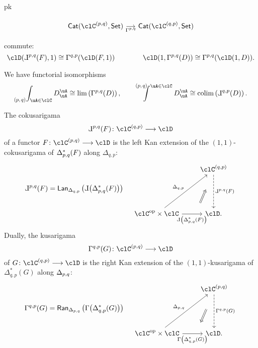 \documentclass[11pt]{amsart}
\begin{document}
\begin{proposition}
\begin{enumtag}{pk}
\begin{center}
\begin{adjustbox}{max height=0.5\textheight, max width=0.875\textwidth}
{\[\begin{tikzcd}[row sep={4.5em,between origins}, column sep={5.0em,between origins}, ampersand replacement=\&]
							\Cat(\pq{\clC},\textsf{Set}) \ar[rr,"\kgfpq{p}{q}"']\&\& \Cat(\pq{\clC}[q][p],\textsf{Set})
						\end{tikzcd}
					\]
				}
			\end{adjustbox}
		\end{center}
        commute:
		\[ 	\clD(\ckgpq{p}{q}{F},1) \cong \kgpq{q}{p}{\clD(F,1)} \qquad \qquad
			\clD(1,\kgpq{p}{q}{D}) \cong \kgpq{p}{q}{\clD(1,D)}.\]
		\item\label{co-limits-of-kusarigamas}We have functorial isomorphisms
		\[
			\pqEnd{p}{q}{\uA\in\clC}D^{\uA}_{\uA}   \cong \lim\left(\kgpq{p}{q}{D}\right),   \qquad
			\pqCoend{p}{q}{\uA\in\clC}D^{\uA}_{\uA} \cong \colim\left(\ckgpq{q}{p}{D}\right).
		\]
		\item\label{higher-arity-co-kusarigamas-from-1-1-co-kusarigamas}The cokusarigama
		\[\ckgpq{p}{q}{F}\colon\pq{\clC}[q][p]\longrightarrow\clD\]
		of a functor $F\colon\pq{\clC}\longrightarrow\clD$ is the left Kan extension of the $(1,1)$-cokusarigama of $\Delta_{p,q}^{*}(F)$ along $\Delta_{q,p}$:
		\[
			\ckgpq{p}{q}{F}
			=
			\Lan_{\Delta_{q,p}}\left(\ckgb{\Delta_{p,q}^{*}(F)}\right)
			\quad
			\begin{tikzcd}[row sep={6.3em,between origins}, column sep={8.1em,between origins}, ampersand replacement=\&]
				{}
				\&
				\pq{\clC}[q][p]
				\arrow[d, "\ckgpq{p}{q}{F}", dashed]
				\\
				\clC^{\op}\times\clC
				\arrow[ru, "\Delta_{q,p}"]
				\arrow[r, "\ckgb{\pqdiag^{*}(F)}"'{name=F}]
				\&
				\clD.
				\arrow[from=F,to=1-2,shorten=2.0em,Rightarrow,xshift=-0.0em,yshift=-0.25em]
			\end{tikzcd}
		\]
		Dually, the kusarigama
		\[\kgpq{q}{p}{G}\colon\pq{\clC}\longrightarrow\clD\]
		of $G\colon\pq{\clC}[q][p]\longrightarrow\clD$ is the right Kan extension of the $(1,1)$-kusarigama of $\Delta_{q,p}^{*}(G)$ along $\Delta_{p,q}$:
		\[
			\kgpq{q}{p}{G}
			=
			\Ran_{\Delta_{p,q}}\left(\kgb{\Delta_{q,p}^{*}(G)}\right)
			\quad
			\begin{tikzcd}[row sep={6.3em,between origins}, column sep={8.1em,between origins}, ampersand replacement=\&]
				{}
				\&
				\pq{\clC}
				\arrow[d, "\kgpq{q}{p}{G}", dashed]
				\\
				\clC^{\op}\times\clC
				\arrow[ru, "\pqdiag"]
				\arrow[r, "\kgb{\Delta_{q,p}^{*}(G)}"'{name=F}]
				\&
				\clD.
				\arrow[from=F,to=1-2,shorten=2.0em,Leftarrow,xshift=-0.0em,yshift=-0.25em]
			\end{tikzcd}
		\]
		\end{enumtag}
\end{proposition}
\label{sec:org2569e2e}
\end{document}
